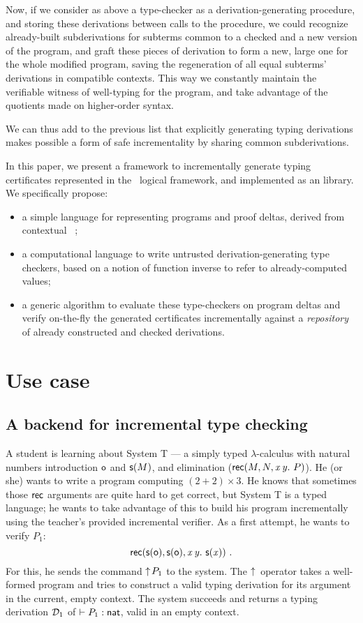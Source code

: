 \documentclass[9pt]{sigplanconf}
\begin{document}
Now, if we consider as above a type-checker as a derivation-generating
procedure, and storing these derivations between calls to the
procedure, we could recognize already-built subderivations for
subterms common to a checked and a new version of the program, and
graft these pieces of derivation to form a new, large one for the
whole modified program, saving the regeneration of all equal subterms'
derivations in compatible contexts. This way we constantly maintain
the verifiable witness of well-typing for the program, and take
advantage of the quotients made on higher-order syntax.

We can thus add to the previous list that explicitly generating typing
derivations makes possible a form of safe incrementality by sharing
common subderivations.

In this paper, we present a framework to incrementally generate typing
certificates represented in the \LF\ logical framework, and implemented
as an  library. We specifically propose:
\begin{itemize}
\item a simple language for representing programs and proof
  deltas, derived from contextual \LF\ \cite{nanevski2008contextual};
\item a computational language to write untrusted
  derivation-generating type checkers, based on a notion of function
  inverse %
  to refer to already-computed values;
\item a generic algorithm to evaluate these type-checkers on program
  deltas and verify on-the-fly the generated certificates
  incrementally against a \emph{repository} of already constructed and
  checked derivations.
\end{itemize}

\section{Use case}

\subsection{A backend for incremental type checking}
\label{sec:use-incremental}

A student is learning about System \sysname T --- a simply typed
$\lambda$-calculus with natural numbers introduction $\text{\textsf{o}}$ and $\text{\textsf{s}} ({M})$,
and elimination ($\text{\textsf{rec}}({M},{N},{\text{\textit{x}}}\,{\text{\textit{y}}}.\ {P})$).  He (or she) wants to write a
program computing $(2+2)\times 3$. He knows that sometimes those
$\text{\textsf{rec}}$ arguments are quite hard to get correct, but System
\sysname T is a typed language; he wants to take advantage of this to
build his program incrementally using the teacher's provided
incremental verifier. As a first attempt, he wants to verify $P_1$:
$$
\recb{\s\z}{\s\z} x y {\s {\var x}}\ \text{.}
$$
For this, he sends the command $\uparrow\!{P_1}$ to the system. The
$\uparrow\!{}$ operator takes a well-formed program and tries to construct
a valid typing derivation for its argument in the current, empty
context. The system succeeds and returns a typing derivation $\mathcal D_1$
of \/ $\vdash P_1 : \text{\textsf{nat}}$, valid in an empty context.
\end{document}

